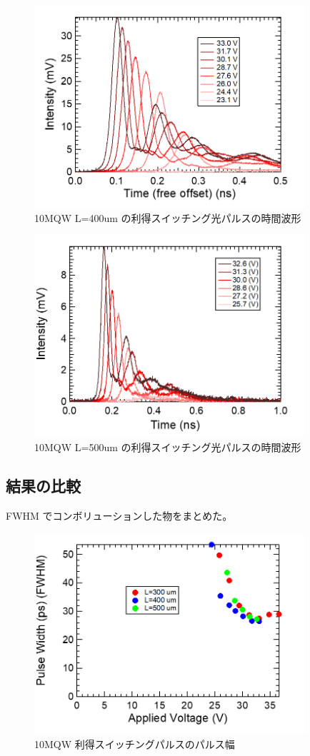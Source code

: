 \begin{figure}[h]
	\centering
	\includegraphics[width=10cm]{figure/fig_3_2_10QW_ridge_L400_GS.png}
		\caption{10MQW L=400um の利得スイッチング光パルスの時間波形}
		\label{fig:fig_3_2_10QW_ridge_L400_GS}
\end{figure}
\begin{figure}[h]
	\centering
	\includegraphics[width=10cm]{figure/fig_3_2_10QW_ridge_L500_GS.png}
		\caption{10MQW L=500um の利得スイッチング光パルスの時間波形}
		\label{fig:fig_3_2_10QW_ridge_L500_GS}
\end{figure}
\subsection{結果の比較}%
FWHM でコンボリューションした物をまとめた。
\begin{figure}[h]
	\centering
	\includegraphics[width=10cm]{figure/fig_3_2_10QW_ridge_GS_FWHM.png}
		\caption{10MQW 利得スイッチングパルスのパルス幅}
		\label{fig:fig_3_2_10QW_ridge_GS_FWHM}
\end{figure}
